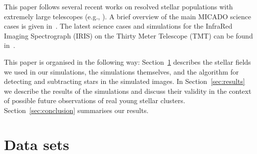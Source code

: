 \documentclass[referee]{aa}
\begin{document}
This paper follows several recent works on resolved stellar populations with extremely large telescopes
(e.g., \citealt{deep11, greggio12, gullieuszik15, tolstoy19_iau}).
A brief overview of the main MICADO science cases is given in~\cite{micado2016}.
The latest science cases and simulations for the InfraRed Imaging Spectrograph (IRIS) on the Thirty Meter Telescope (TMT) can be found in~\cite{tmt_iris16}.

This paper is organised in the following way: Section~\ref{sec:observations} describes the stellar fields we used in our simulations, the simulations themselves, and the algorithm for detecting and subtracting stars in the simulated images.
In Section~\ref{sec:results} we describe the results of the simulations and discuss their validity in the context of possible future observations of real young stellar clusters.
Section~\ref{sec:conclusion} summarises our results.



\section{Data sets}
\label{sec:observations}
\end{document}

